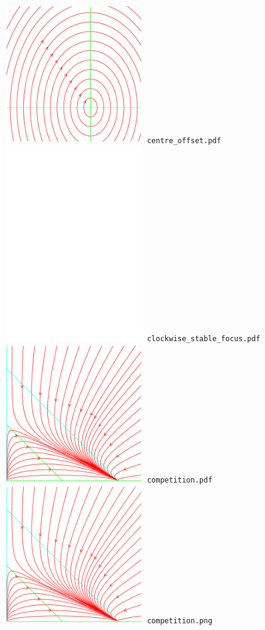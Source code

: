 \documentclass[a4paper]{amsart}
\begin{document}
\includegraphics[width=6cm]{centre_offset.pdf}\verb+ centre_offset.pdf+\\
\includegraphics[width=6cm]{clockwise_stable_focus.pdf}\verb+ clockwise_stable_focus.pdf+\\
\includegraphics[width=6cm]{competition.pdf}\verb+ competition.pdf+\\
\includegraphics[width=6cm]{competition.png}\verb+ competition.png+\\
\end{document}

